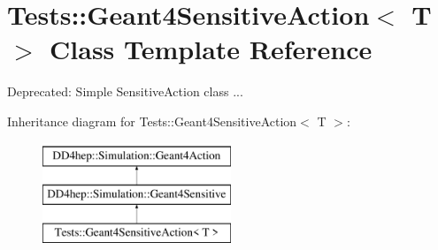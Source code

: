 \hypertarget{class_tests_1_1_geant4_sensitive_action}{}\section{Tests\+:\+:Geant4\+Sensitive\+Action$<$ T $>$ Class Template Reference}
\label{class_tests_1_1_geant4_sensitive_action}


Deprecated\+: Simple Sensitive\+Action class ...  


Inheritance diagram for Tests\+:\+:Geant4\+Sensitive\+Action$<$ T $>$\+:\begin{figure}[H]
\begin{center}
\leavevmode
\includegraphics[height=3.000000cm]{class_tests_1_1_geant4_sensitive_action}
\end{center}
\end{figure}

